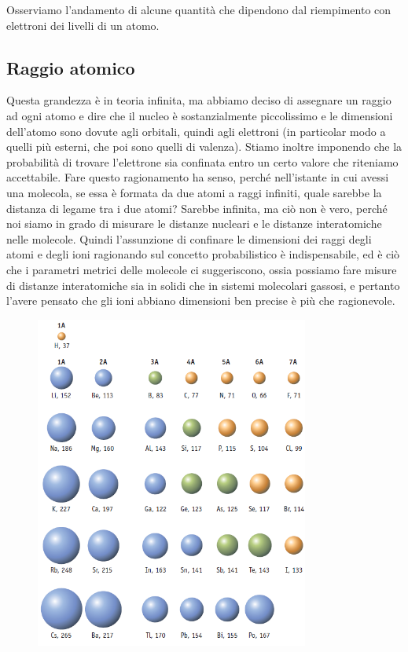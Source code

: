Osserviamo l'andamento di alcune quantità che dipendono dal riempimento con elettroni dei livelli di un atomo.

\subsection{Raggio atomico}

Questa grandezza è in teoria infinita, ma abbiamo deciso di assegnare un raggio ad ogni atomo e dire che il nucleo è sostanzialmente piccolissimo e le dimensioni dell'atomo sono dovute agli orbitali, quindi agli elettroni (in particolar modo a quelli più esterni, che poi sono quelli di valenza). Stiamo inoltre imponendo che la probabilità di trovare l'elettrone sia confinata entro un certo valore che riteniamo accettabile. Fare questo ragionamento ha senso, perché nell'istante in cui avessi una molecola, se essa è formata da due atomi a raggi infiniti, quale sarebbe la distanza di legame tra i due atomi? Sarebbe infinita, ma ciò non è vero, perché noi siamo in grado di misurare le distanze nucleari e le distanze interatomiche nelle molecole. Quindi l'assunzione di confinare le dimensioni dei raggi degli atomi e degli ioni ragionando sul concetto probabilistico è indispensabile, ed è ciò che i parametri metrici delle molecole ci suggeriscono, ossia possiamo fare misure di distanze interatomiche sia in solidi che in sistemi molecolari gassosi, e pertanto l'avere pensato che gli ioni abbiano dimensioni ben precise è più che ragionevole.

\begin{figure}[htp]
    \centering
    \includegraphics[width=9cm]{immagini/raggi-atomici.png}
\end{figure}

